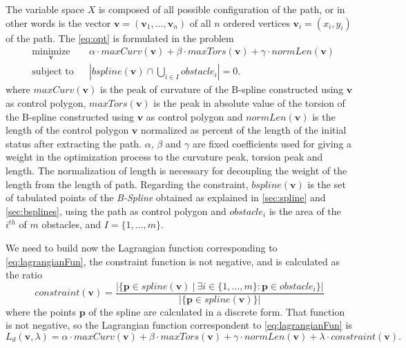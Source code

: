 \documentclass[dissertation.tex]{subfiles}
\begin{document}
The variable space $X$ is composed of all possible
configuration of the path, or in other words is the vector
$\mathbf{v}=(\mathbf{v}_1,\dots,\mathbf{v}_n)$ of all $n$ ordered
vertices $\mathbf{v}_i=(x_i,y_i)$ of the
path. The \cref{eq:opt} is formulated in the problem
\begin{equation*}
  \begin{aligned}
    & \underset{\mathbf{v}}{\text{minimize}}
    & & \alpha\cdot maxCurv(\mathbf{v})+\beta\cdot
    maxTors(\mathbf{v})+\gamma\cdot normLen(\mathbf{v}) \\
    & \text{subject to}
    & & \left|bspline(\mathbf{v})\cap \bigcup_{i\in I}obstacle_i\right| = 0.
  \end{aligned}
\end{equation*}
where $maxCurv(\mathbf{v})$ is the peak of curvature of the B-spline
constructed using $\mathbf{v}$ as control polygon,
$maxTors(\mathbf{v})$ is the peak in absolute value of the torsion of
the B-spline constructed using $\mathbf{v}$ as control polygon and
$normLen(\mathbf{v})$ is the length of the control polygon
$\mathbf{v}$ normalized as percent of the length of the initial status
after extracting the path. $\alpha$, $\beta$ and $\gamma$ are fixed
coefficients used for giving a weight in the optimization process to
the curvature peak, torsion peak and length. The normalization of
length is necessary for decoupling the weight of the length from the
length of path. Regarding the constraint, $bspline(\mathbf{v})$
is the set of tabulated points of the \emph{B-Spline} obtained as
explained in
\cref{sec:spline} and \cref{sec:bsplines}, using the path as
control polygon and
$obstacle_i$ is the area of the $i^{th}$ of $m$ obstacles, and
$I=\{1,\dots,m\}$.

We need to build now the Lagrangian function corresponding to
\cref{eq:lagrangianFun}, the constraint function is not negative, and is calculated as the
ratio
\begin{equation*}
constraint(\mathbf{v}) = \frac{|\{\mathbf{p} \in spline(\mathbf{v})\ |\ \exists i\in\{1,\dots,m\}
  : \mathbf{p}\in obstacle_i \}|}{|\{\mathbf{p} \in spline(\mathbf{v})\}|}
\end{equation*}
where the points $\mathbf{p}$ of the spline are calculated in a discrete form. That
function is not negative, so the Lagrangian function correspondent to
\cref{eq:lagrangianFun} is
\begin{equation}\label{eq:lagrangianFunProj}
    L_d(\mathbf{v},\lambda)=\alpha\cdot maxCurv(\mathbf{v})+\beta\cdot
    maxTors(\mathbf{v})+\gamma\cdot normLen(\mathbf{v})+\lambda\cdot constraint(\mathbf{v}).
\end{equation}
\end{document}
